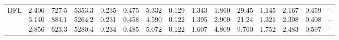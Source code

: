 \begin{landscape}
\begin{table}[t]
{\begin{tabular}{@{}lrrrrrrrrrrrrrr@{}}
DFL & \makecell[r]{2.406\\3.140\\2.856} & \makecell[r]{727.5\\884.1\\623.3} & \makecell[r]{5353.3\\5264.2\\5280.4} & \makecell[r]{0.235\\0.231\\0.234} & \makecell[r]{0.475\\0.458\\0.485} & \makecell[r]{5.332\\4.590\\5.072} & \makecell[r]{0.129\\0.122\\0.122} & \makecell[r]{1.343\\1.395\\1.607} & \makecell[r]{1.860\\2.909\\4.809} & \makecell[r]{29.45\\21.24\\9.760} & \makecell[r]{1.145\\1.321\\1.752} & \makecell[r]{2.167\\2.308\\2.483} & \makecell[r]{0.459\\0.408\\0.597} & \makecell[r]{--\\--\\--} \\

\end{tabular}}
\end{table}
\end{landscape}
